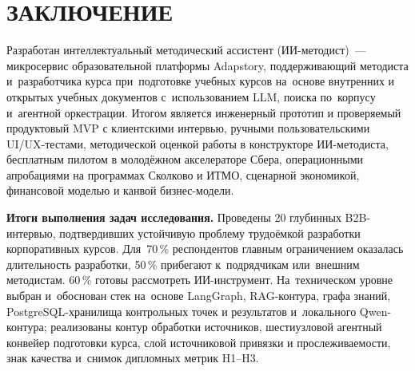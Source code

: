 \chapter*{ЗАКЛЮЧЕНИЕ}
\sloppy

Разработан интеллектуальный методический ассистент
(ИИ-методист)~— микросервис образовательной платформы Adapstory,
поддерживающий методиста и~разработчика курса при~подготовке учебных
курсов на~основе внутренних и открытых учебных документов с~использованием LLM,
поиска по~корпусу и~агентной оркестрации.
Итогом является инженерный прототип и проверяемый продуктовый MVP
с клиентскими интервью, ручными пользовательскими UI/UX-тестами,
методической оценкой работы в конструкторе ИИ-методиста,
бесплатным пилотом в молодёжном акселераторе Сбера,
операционными апробациями на программах Сколково и ИТМО,
сценарной экономикой, финансовой моделью и канвой бизнес-модели.

\textbf{Итоги выполнения задач исследования.}
Проведены 20 глубинных B2B-интервью, подтвердивших
устойчивую проблему трудоёмкой разработки корпоративных курсов.
Для~70\,\% респондентов главным ограничением оказалась
длительность разработки, 50\,\% прибегают к~подрядчикам
или~внешним методистам. 60\,\% готовы рассмотреть ИИ-инструмент.
На~техническом уровне выбран и~обоснован
стек на~основе LangGraph, RAG-контура, графа знаний,
PostgreSQL-хранилища контрольных точек и результатов и~локального Qwen-контура;
реализованы контур обработки источников, шестиузловой агентный конвейер
подготовки курса, слой источниковой привязки и прослеживаемости,
знак качества и~снимок
дипломных метрик H1–H3.

